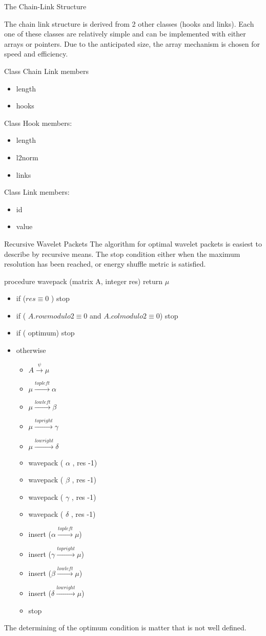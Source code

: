 The Chain-Link Structure

The chain link structure is derived from 2 other classes (hooks and links).   Each one of these classes are relatively simple and can be implemented with either arrays or pointers.  Due to the anticipated size, the array mechanism is chosen for speed and efficiency.  

Class Chain Link members
\begin{itemize}
\item length 
\item hooks
\end{itemize}

Class Hook 
members:
\begin{itemize}
\item length
\item l2norm
\item links 
\end{itemize}



Class Link
members: 
\begin{itemize}
\item id
\item value
\end{itemize}


Recursive Wavelet Packets
The algorithm for optimal wavelet packets is easiest to describe by recursive means.  The stop condition either when the maximum resolution has been reached, or energy shuffle metric is satisfied.  

procedure wavepack (matrix A, integer res) return $\mu$
\begin{itemize}
\item if ($res \equiv 0$  ) stop
\item if ( $A.row {modulo} 2 \equiv  0$ and $A.col {modulo} 2 \equiv 0$) stop
\item if ( optimum) stop
\item otherwise 
\begin{itemize}
\item $A \stackrel{\psi}{\to} \mu $
\item $\mu \stackrel{topleft}{\to} \alpha$
\item $\mu \stackrel{lowleft}{\to} \beta$
\item $\mu \stackrel{topright}{\to} \gamma$
\item $\mu \stackrel{lowright}{\to} \delta$
\item wavepack ( $\alpha$ , res -1)
\item wavepack ( $\beta$ , res -1)
\item wavepack ( $\gamma$ , res -1)
\item wavepack ( $\delta$ , res -1)
\item insert ($\alpha  \stackrel{topleft}{\to} \mu$)
\item insert ($\gamma  \stackrel{topright}{\to} \mu$)
\item insert ($\beta  \stackrel{lowleft}{\to} \mu$)
\item insert ($\delta  \stackrel{lowright}{\to} \mu$)
\item stop
\end{itemize}

\end{itemize}

The determining of the optimum condition is matter that is not well defined. 



